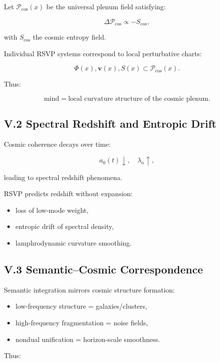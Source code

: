 \documentclass[12pt]{article}
\begin{document}
Let $\mathcal{P}_{\mathrm{cos}}(x)$ be the universal plenum field satisfying:

\[
\Delta \mathcal{P}_{\mathrm{cos}} \propto -S_{\mathrm{cos}},
\]

with $S_{\mathrm{cos}}$ the cosmic entropy field.

Individual RSVP systems correspond to local perturbative charts:

\[
\Phi(x),\mathbf{v}(x),S(x)
\subset
\mathcal{P}_{\mathrm{cos}}(x).
\]

Thus:

\[
\text{mind} = \text{local curvature structure of the cosmic plenum}.
\]

\subsection*{V.2 Spectral Redshift and Entropic Drift}

Cosmic coherence decays over time:

\[
a_0(t) \downarrow, \quad \lambda_n \uparrow,
\]

leading to spectral redshift phenomena.

RSVP predicts redshift without expansion:

\begin{itemize}
\item loss of low-mode weight,
\item entropic drift of spectral density,
\item lamphrodynamic curvature smoothing.
\end{itemize}

\subsection*{V.3 Semantic--Cosmic Correspondence}

Semantic integration mirrors cosmic structure formation:

\begin{itemize}
\item low-frequency structure = galaxies/clusters,
\item high-frequency fragmentation = noise fields,
\item nondual unification = horizon-scale smoothness.
\end{itemize}

Thus:
\end{document}
